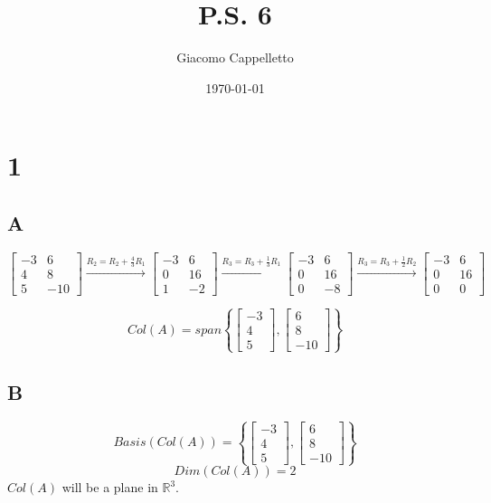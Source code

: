 \documentclass{article}
\title{P.S. 6}
\author{Giacomo Cappelletto}
\date{\today}
\begin{document}
\maketitle

\section*{1}

\subsection*{A}

\[
	\begin{bmatrix}
		-3 & 6   \\
		4  & 8   \\
		5  & -10
	\end{bmatrix}
	\xrightarrow{R_2=R_2+\frac{4}{3}R_1}
	\begin{bmatrix}
		-3 & 6  \\
		0  & 16 \\
		1  & -2
	\end{bmatrix}
	\xrightarrow{R_3=R_3+\frac{1}{3}R_1}
	\begin{bmatrix}
		-3 & 6  \\
		0  & 16 \\
		0  & -8
	\end{bmatrix}
	\xrightarrow{R_3=R_3+\frac{1}{2}R_2}
	\begin{bmatrix}
		-3 & 6  \\
		0  & 16 \\
		0  & 0
	\end{bmatrix}
\]

\[
	Col(A) = span \left\{\begin{bmatrix} -3 \\ 4 \\ 5 \end{bmatrix},\begin{bmatrix} 6 \\ 8 \\ -10 \end{bmatrix} \right\}
\]

\subsection*{B}

\[
	Basis(Col(A)) = \left\{ \begin{bmatrix} -3 \\ 4 \\ 5 \end{bmatrix}, \begin{bmatrix} 6 \\ 8 \\ -10 \end{bmatrix} \right\}
\]
\[
	Dim(Col(A)) = 2
\]
\(Col(A)\) will be a plane in \(\mathbb{R}^3\).
\end{document}
